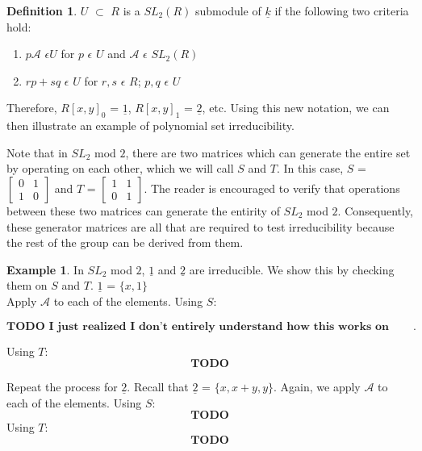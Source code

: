 \documentclass[a4paper,draft]{amsproc}
\theoremstyle{plain}
\theoremstyle{definition}
\newtheorem{exm}{Example}[section]
\newtheorem{dfn}{Definition}[section]
\theoremstyle{remark}
\numberwithin{equation}{section}
\begin{document}
\begin{dfn}
$U$ $\subset$ $R$ is a  $SL_{2}(R)$ submodule of $\underline{k}$ if the following two criteria hold: 

\begin{enumerate}
  \item $p  \mathcal{A}$ $\epsilon U$ for $p$ $\epsilon$ $U$ and $\mathcal{A}$ $\epsilon$ $SL_{2}(R)$ 
  \item $rp + sq$ $\epsilon$ $U$ for $r, s$ $\epsilon$ $R$; $p, q$ $\epsilon$ $U$
\end{enumerate}

\end{dfn}
Therefore, $R[x,y]_{0}$ = $\underline{1}$, $R[x,y]_{1}$ = $\underline{2}$, etc. Using this new notation, we can then illustrate an example of polynomial set irreducibility. 

Note that in $SL_{2}$ mod $2$, there are two matrices which can generate the entire set by operating on each other, which we will call $S$ and $T$. In this case, $S$ = 
$\begin{bmatrix}
 0&1 \\ 
 1&0 
\end{bmatrix}$ and $T$ = $\begin{bmatrix}
 1&1 \\ 
 0&1 
\end{bmatrix}$. The reader is encouraged to verify that operations between these two matrices can generate the entirity of $SL_{2}$ mod $2$. Consequently, these generator matrices are all that are required to test irreducibility because the rest of the group can be derived from them. 

\begin{exm}
In  $SL_{2}$ mod $2$, $\underline{1}$ and $\underline{2}$ are irreducible. We show this by checking them on $S$ and $T$. 
$\underline{1}$ = $\{x, 1\}$\\  Apply $\mathcal{A}$ to each of the elements. Using $S$: 

$$\textbf{TODO I just realized I don't entirely understand how this works on constants}. $$

Using $T$: 
$$\textbf{TODO}$$

Repeat the process for $\underline{2}$. Recall that $\underline{2}$ = $\{x, x + y, y\}$. Again, we apply $\mathcal{A}$ to each of the elements. Using $S$: 
$$
\textbf{TODO}
$$
Using $T$: 
$$
\textbf{TODO}
$$
\end{exm}
\end{document}
